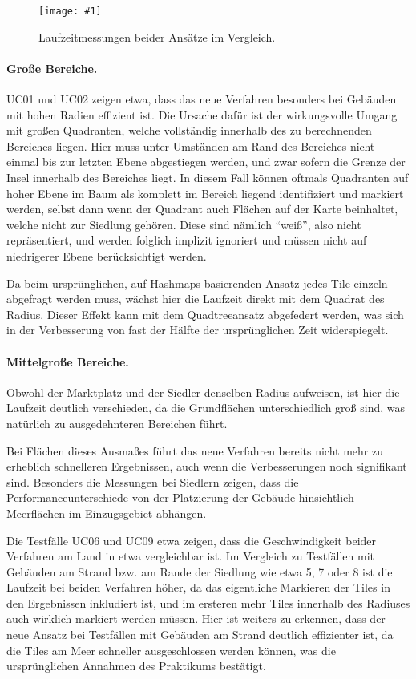 \documentclass[%
			paper=a4,%
			DIV12,
			liststotoc,
			bibtotoc,
			draft=false,%
			titlepage,
			numbers=noendperiod
			]{scrartcl}
\newcommand{\myfig}[5] {
 \begin{figure}[tbph]
	 \centering
	 \texttt{[image: \#1]}
	 \caption[#4]{#5}
	 \label{fig:#2}
 \end{figure}
}
\begin{document}
\myfig{img/testdata}{testdata}{width=\textwidth}{Laufzeitmessungen beider Ansätze im Vergleich}{Laufzeitmessungen beider Ansätze im Vergleich.}

\paragraph{Große Bereiche.}
UC01 und UC02 zeigen etwa, dass das neue Verfahren besonders bei Gebäuden mit hohen Radien effizient ist.
Die Ursache dafür ist der wirkungsvolle Umgang mit großen Quadranten, welche vollständig innerhalb des zu berechnenden Bereiches liegen.
Hier muss unter Umständen am Rand des Bereiches nicht einmal bis zur letzten Ebene abgestiegen werden, und zwar sofern die Grenze der Insel innerhalb des Bereiches liegt.
In diesem Fall können oftmals Quadranten auf hoher Ebene im Baum als komplett im Bereich liegend identifiziert und markiert werden, selbst dann wenn der Quadrant auch Flächen auf der Karte beinhaltet, welche nicht zur Siedlung gehören.
Diese sind nämlich "`weiß"', also nicht repräsentiert, und werden folglich implizit ignoriert und müssen nicht auf niedrigerer Ebene berücksichtigt werden.

Da beim ursprünglichen, auf Hashmaps basierenden Ansatz jedes Tile einzeln abgefragt werden muss, wächst hier die Laufzeit direkt mit dem Quadrat des Radius. Dieser Effekt kann mit dem Quadtreeansatz abgefedert werden, was sich in der Verbesserung von fast der Hälfte der ursprünglichen Zeit widerspiegelt.

\paragraph{Mittelgroße Bereiche.}
Obwohl der Marktplatz und der Siedler denselben Radius aufweisen, ist hier die Laufzeit deutlich verschieden, da die Grundflächen unterschiedlich groß sind, was natürlich zu ausgedehnteren Bereichen führt.

Bei Flächen dieses Ausmaßes führt das neue Verfahren bereits nicht mehr zu erheblich schnelleren Ergebnissen, auch wenn die Verbesserungen noch signifikant sind.
Besonders die Messungen bei Siedlern zeigen, dass die Performanceunterschiede von der Platzierung der Gebäude hinsichtlich Meerflächen im Einzugsgebiet abhängen.

Die Testfälle UC06 und UC09 etwa zeigen, dass die Geschwindigkeit beider Verfahren am Land in etwa vergleichbar ist.
Im Vergleich zu Testfällen mit Gebäuden am Strand bzw. am Rande der Siedlung wie etwa 5, 7 oder 8 ist die Laufzeit bei beiden Verfahren höher, da das eigentliche Markieren der Tiles in den Ergebnissen inkludiert ist, und im ersteren mehr Tiles innerhalb des Radiuses auch wirklich markiert werden müssen.
Hier ist weiters zu erkennen, dass der neue Ansatz bei Testfällen mit Gebäuden am Strand deutlich effizienter ist, da die Tiles am Meer schneller ausgeschlossen werden können, was die ursprünglichen Annahmen des Praktikums bestätigt.
\end{document}
